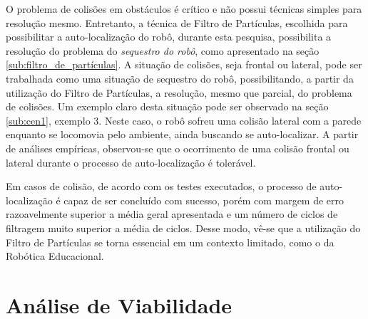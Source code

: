 O problema de colisões em obstáculos é crítico e não possui técnicas simples para resolução mesmo. Entretanto, a técnica de Filtro
de Partículas, escolhida para possibilitar a auto-localização do robô, durante esta pesquisa,
possibilita a resolução do problema do \textit{sequestro do robô}, como apresentado na seção \ref{sub:filtro_de_partículas}. A situação
de colisões, seja frontal ou lateral, pode ser trabalhada como uma situação de sequestro do robô, possibilitando, a partir da utilização
do Filtro de Partículas, a resolução, mesmo que parcial, do problema de colisões. Um exemplo claro desta situação pode ser observado
na seção \ref{sub:cen1}, exemplo 3. Neste caso, o robô sofreu uma colisão lateral com a parede enquanto se locomovia pelo ambiente,
ainda buscando se auto-localizar. A partir de análises empíricas, observou-se que o ocorrimento de uma colisão frontal ou lateral durante
o processo de auto-localização é tolerável.

Em casos de colisão, de acordo com os testes executados, o processo de auto-localização é capaz de ser concluído com sucesso, porém
com margem de erro razoavelmente superior a média geral apresentada e um número de ciclos de filtragem muito superior a média de ciclos. Desse modo,
vê-se que a utilização do Filtro de Partículas se torna essencial em um contexto limitado, como o da Robótica Educacional.

\section{Análise de Viabilidade}
\label{sec:viabilidade}
